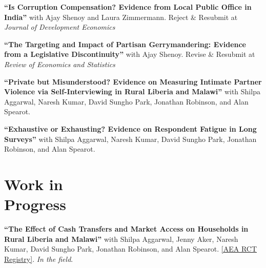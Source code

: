 \documentclass[letterpaper, margin, 10pt]{res} %
\begin{document}
\begin{resume}
\normalsize
{\bf ``{Is Corruption Compensation? Evidence from Local Public Office in India}''} with Ajay Shenoy and Laura Zimmermann. Reject \& Resubmit at \textit{Journal of Development Economics} %



\normalsize
{\bf ``{The Targeting and Impact of Partisan Gerrymandering: Evidence from a Legislative Discontinuity}''} with Ajay Shenoy. Revise \& Resubmit at \textit{Review of Economics and Statistics} %

{\bf ``Private but Misunderstood? Evidence on Measuring Intimate Partner Violence via Self-Interviewing in Rural Liberia and Malawi''}
with Shilpa Aggarwal, Naresh Kumar, David Sungho Park, Jonathan Robinson, and Alan Spearot.

{\bf ``Exhaustive or Exhausting? Evidence on Respondent Fatigue in Long Surveys''}
with Shilpa Aggarwal, Naresh Kumar, David Sungho Park, Jonathan Robinson, and Alan Spearot.

\normalsize\section{\textbf{Work in  \\ Progress}}
{\bf ``{The Effect of Cash Transfers and Market Access on Households in Rural Liberia and Malawi}''}
 with Shilpa Aggarwal, Jenny Aker, Naresh Kumar, David Sungho Park, Jonathan Robinson, and Alan Spearot. \href{https://www.socialscienceregistry.org/trials/4869}{{[AEA RCT Registry]}}. \textit{In the field}.
 

\end{resume}
\end{document}
